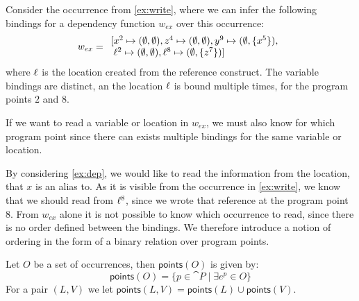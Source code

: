 \documentclass{llncs}
\newcommand{\sqleq}{\ensuremath{\sqsubseteq\xspace}}
\newcommand{\points}{\ensuremath{\textsf{points}}}
\begin{document}
\begin{example}\label{ex:dep}
	Consider the occurrence from \cref{ex:write}, where we can
        infer the following bindings for a dependency function
        $w_{ex}$ over this occurrence: 
	\[
          w_{ex}= \begin{array}{l}
                    [x^2\mapsto(\emptyset,\emptyset),z^4\mapsto(\emptyset,\emptyset),y^9\mapsto(\emptyset,\{x^5\}),
                    \\ \; \ell^2\mapsto(\emptyset,\emptyset),\ell^8\mapsto(\emptyset,\{z^7\})] \end{array} \]
	where $\ell$ is the location created from the reference construct.
	The variable bindings are distinct, an the location $\ell$ is
        bound multiple times, for the program points $2$ and $8$. 

	If we want to read a variable or location in $w_{ex}$, we must
        also know for which program point since there can exists
        multiple bindings for the same variable or location. 
\end{example}

By considering \cref{ex:dep}, we would like to read the information
from the location, that $x$ is an alias to.  As it is visible from the
occurrence in \cref{ex:write}, we know that we should read from
$\ell^8$, since we wrote that reference at the program point $8$.
From $w_{ex}$ alone it is not possible to know which occurrence to
read, since there is no order defined between the bindings.  We therefore
introduce a notion of ordering in the form of a binary relation over
program points.%



\begin{definition}\label{def:OccPP}
	Let $O$ be a set of occurrences, then $\points(O)$ is given by:
	\[ \points(O)=\{p\in\cat{P}\mid\exists e^p\in O\} \]
        For a pair $(L,V)$ we let $\points(L,V) = \points(L) \cup \points(V)$.
\end{definition}
\end{document}
